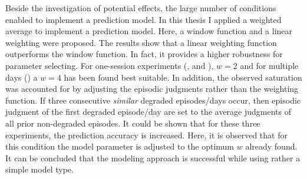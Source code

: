 Beside the investigation of potential effects, the large number of conditions enabled to implement a prediction model.
In this thesis I applied a weighted average to implement a prediction model.
Here, a window function and a linear weighting were proposed.
The results show that a linear weighting function outperforms the window function.
In fact, it provides a higher robustness for parameter selecting.
For one-session experiments (, and \EIIa{}), $\mathit{w}=2$ and for multiple days () a $\mathit{w}=4$ has been found best suitable.
In addition, the observed saturation was accounted for by adjusting the episodic judgments rather than the weighting function.
If three consecutive \emph{similar} degraded episodes/days occur, then episodic judgment of the first degraded episode/day are set to the average judgments of all prior non-degraded episodes.
It could be shown that for these three experiments, the prediction accuracy is increased.
Here, it is observed that for this condition the model parameter is adjusted to the optimum $\mathit{w}$ already found.
It can be concluded that the modeling approach is successful while using rather a simple model type.


